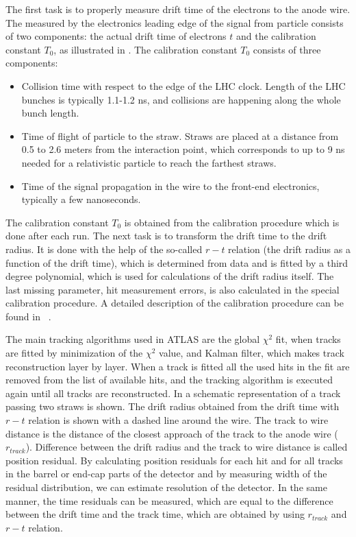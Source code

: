 The first task is to properly measure drift time of the electrons to the anode wire. The measured by the electronics leading edge of the signal from particle 
consists of two components: the actual drift time of electrons $t$ and the calibration constant $T_{0}$, as illustrated in .
The calibration constant $T_{0}$ consists of three components:
\begin{itemize}
 \item Collision time with respect to the edge of the LHC clock. Length of the LHC bunches is typically 1.1-1.2 ns, and collisions are happening along the whole bunch length.
 \item Time of flight of particle to the straw. Straws are placed at a distance from 0.5 to 2.6 meters from the interaction point, 
 which corresponds to up to 9 ns needed for a relativistic particle to reach the farthest straws.
 \item Time of the signal propagation in the wire to the front-end electronics, typically a few nanoseconds.
\end{itemize}
The calibration constant $T_{0}$ is obtained from the calibration procedure which is done after each run.
The next task is to transform the drift time to the drift radius. It is done with the help of the so-called $r-t$ relation (the drift radius as a function of the drift time), 
which is determined from data and is fitted by a third degree polynomial, which is used for calculations of the drift radius itself.
The last missing parameter, hit measurement errors, is also calculated in the special calibration procedure. A detailed description of the calibration procedure
can be found in ~\cite{alonso_thesis}.

The main tracking algorithms used in ATLAS are the global $\chi^2$ fit, when tracks are fitted by minimization of the $\chi^2$ value, and Kalman filter, which makes track reconstruction
layer by layer. When a track is fitted all the used hits in the fit are removed from the list of available hits, and the tracking algorithm is executed again until all tracks are reconstructed.
In  a schematic representation of a track passing two straws is shown. The drift radius obtained from the drift time with $r-t$ relation is
shown with a dashed line around the wire. The track to wire distance is the distance of the closest approach of the track to the anode wire ($r_{track}$). Difference
between the drift radius and the track to wire distance is called position residual. By calculating position residuals for each hit and for all
tracks in the barrel or end-cap parts of the detector and by measuring width of the residual distribution, we can estimate resolution of the detector.
In the same manner, the time residuals can be measured, which are equal to the difference between the drift time and the track time, which are obtained by using $r_{track}$ and 
$r-t$ relation.


